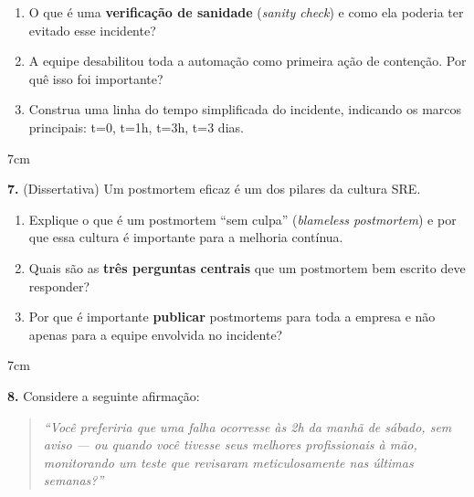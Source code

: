 \documentclass[12pt]{article}
\begin{document}
\begin{enumerate}[label=\alph*)]
  \item O que é uma \textbf{verificação de sanidade} (\textit{sanity check}) e como ela
        poderia ter evitado esse incidente?
  \item A equipe desabilitou toda a automação como primeira ação de contenção. Por quê
        isso foi importante?
  \item Construa uma linha do tempo simplificada do incidente, indicando os marcos
        principais: t=0, t=1h, t=3h, t=3 dias.
\end{enumerate}
\begin{resposta}{7cm}
\end{resposta}

\vspace{0.5cm}

\textbf{7.} (Dissertativa) Um postmortem eficaz é um dos pilares da cultura SRE.

\begin{enumerate}[label=\alph*)]
  \item Explique o que é um postmortem ``sem culpa'' (\textit{blameless postmortem})
        e por que essa cultura é importante para a melhoria contínua.
  \item Quais são as \textbf{três perguntas centrais} que um postmortem bem escrito
        deve responder?
  \item Por que é importante \textbf{publicar} postmortems para toda a empresa e não
        apenas para a equipe envolvida no incidente?
\end{enumerate}
\begin{resposta}{7cm}
\end{resposta}

\vspace{0.5cm}

\textbf{8.} Considere a seguinte afirmação:

\begin{quote}
  \textit{``Você preferiria que uma falha ocorresse às 2h da manhã de sábado, sem aviso
  — ou quando você tivesse seus melhores profissionais à mão, monitorando um teste
  que revisaram meticulosamente nas últimas semanas?''}
\end{quote}
\end{document}
